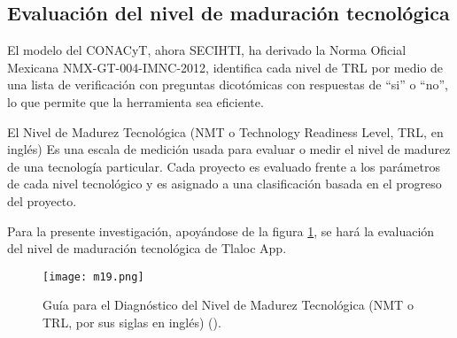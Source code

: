\subsection{Evaluación del nivel de maduración tecnológica}

El modelo del CONACyT, ahora SECIHTI, ha derivado la Norma Oficial Mexicana NMX-GT-004-IMNC-2012, identifica cada nivel de TRL por medio de una lista de verificación con preguntas dicotómicas con respuestas de ``si'' o ``no'', lo que permite que la herramienta sea eficiente.


El Nivel de Madurez Tecnológica (NMT o Technology Readiness Level, TRL, en inglés) 
Es una escala de medición usada para evaluar o medir el nivel de madurez de una
tecnología particular. Cada proyecto es evaluado frente a los parámetros de cada
nivel tecnológico y es asignado a una clasificación basada en el progreso del
proyecto.

Para la presente investigación, apoyándose de la figura \ref{m19}, se hará la evaluación del nivel de maduración tecnológica de Tlaloc App.

\begin{figure}[h!]
\centering
  \texttt{[image: m19.png]}
  \caption{Guía para el Diagnóstico del Nivel de Madurez Tecnológica (NMT o TRL, por sus siglas en inglés) (\cite{SECIHTIConvocatorias}).}
  \label{m19}
\end{figure}
